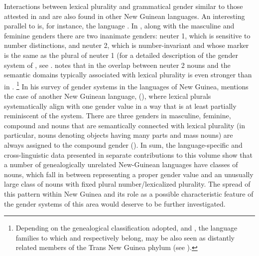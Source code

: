 \documentclass[output=collectionpaper]{langsci/langscibook}
\begin{document}
Interactions between lexical plurality and grammatical gender similar to those attested in  and  are also found in other New Guinean languages. An interesting parallel to  is, for instance, the  language . In , along with the masculine and feminine genders there are two inanimate genders: neuter 1, which is sensitive to number distinctions, and neuter 2, which is number-invariant and whose marker is the same as the plural of neuter 1 (for a detailed description of the gender system of , see \cite{Fedden2011}.  notes that in  the overlap between neuter 2 nouns and the semantic domains typically associated with lexical plurality is even stronger than in .%
\footnote{%
Depending on the genealogical classification adopted,  and , the language families to which  and  respectively belong, may be also seen as distantly related members of the Trans New Guinea phylum (see ).
} %
In his survey of gender systems in the languages of New Guinea,  mentions the case of another New Guinean language,  (), where lexical plurals systematically align with one gender value in a way that is at least partially reminiscent of the  system. There are three genders in  \textendash{} masculine, feminine, compound \textendash{} and nouns that are semantically connected with lexical plurality (in particular, nouns denoting objects having many parts and mass nouns) are always assigned to the compound gender (\citealt[68]{Arsjoe1999}). In sum, the language-specific and cross-linguistic data presented in separate contributions to this volume show that a number of genealogically unrelated New-Guinean languages have classes of nouns, which fall in between representing a proper gender value and an unusually large class of nouns with fixed plural number/lexicalized plurality. The spread of this pattern within New Guinea and its role as a possible characteristic feature of the gender systems of this area would deserve to be further investigated.
\end{document}
